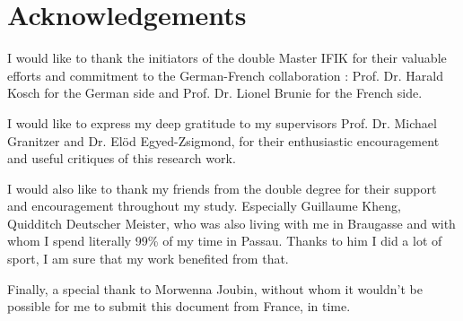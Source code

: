 \thispagestyle{plain}

\section*{Acknowledgements}
I would like to thank the initiators of the double Master IFIK for their valuable efforts and commitment to the German-French collaboration : Prof. Dr. Harald Kosch
for the German side and Prof. Dr. Lionel Brunie for the French side.

I would like to express my deep gratitude to my supervisors Prof. Dr. Michael Granitzer and Dr. El{\"o}d Egyed-Zsigmond, for their enthusiastic encouragement and useful critiques of this research work. 

I would also like to thank my friends from the double degree for their support and encouragement throughout my study. Especially Guillaume Kheng, Quidditch Deutscher Meister, who was also living with me in Braugasse and with whom I spend literally 99\% of my time in Passau. Thanks to him I did a lot of sport, I am sure that my work benefited from that.

Finally, a special thank to Morwenna Joubin, without whom it wouldn't be possible for me to submit this document from France, in time.